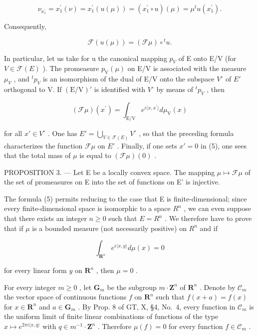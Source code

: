 \[
\nu_ {x _ {1} ^ {\prime}} = x _ {1} ^ {\prime} (\nu) = x _ {1} ^ {\prime} (u (\mu)) = \left(x _ {1} ^ {\prime} \circ u\right) (\mu) = \mu^ {t} u \left(x _ {1} ^ {\prime}\right).
\]

Consequently,

\[
\mathscr {F} (u (\mu)) = (\mathscr {F} \mu) \circ {} ^ {t} u.\tag{4}
\]

In particular, let us take for u the canonical mapping \(p_{V}\) of E onto E/V (for \(V \in \mathcal{F}(E)\) ). The promeasure \(p_{\mathrm{V}}(\mu)\) on E/V is associated with the measure \(\mu_{V}\) , and \(^{t}p_{V}\) is an isomorphism of the dual of E/V onto the subspace \(V^{\circ}\) of \(E'\) orthogonal to V. If \((\mathrm{E}/\mathrm{V})'\) is identified with \(V^{\circ}\) by means of \(^{t}p_{V}\) , then

\[
(\mathcal {F} \mu) (x ^ {\prime}) = \int_ {\mathrm{E} / \mathrm{V}} e ^ {i \langle x, x ^ {\prime} \rangle} d \mu_ {\mathrm{V}} (x)\tag{5}
\]

for all \(x' \in V^{\circ}\) . One has \(E' = \bigcup_{V \in \mathcal{F}(E)} V^{\circ}\) , so that the preceding formula characterizes the function \(\mathcal{F}\mu\) on \(E'\) . Finally, if one sets \(x' = 0\) in (5), one sees that the total mass of \(\mu\) is equal to \((\mathcal{F}\mu)(0)\) .

PROPOSITION 3. --- Let E be a locally convex space. The mapping \(\mu \mapsto \mathcal{F}\mu\) of the set of promeasures on E into the set of functions on E' is injective.

The formula (5) permits reducing to the case that E is finite-dimensional; since every finite-dimensional space is isomorphic to a space \(R^{n}\) , we can even suppose that there exists an integer \(n \geqslant 0\) such that \(E = R^{n}\) . We therefore have to prove that if \(\mu\) is a bounded measure (not necessarily positive) on \(R^{n}\) and if

\[
\int_ {\mathbf {R} ^ {n}} e ^ {i \langle x, y \rangle} d \mu (x) = 0
\]

for every linear form \(y\) on \(\mathbf{R}^n\) , then \(\mu = 0\) .

For every integer \(m \geqslant 0\) , let \(\mathbf{G}_m\) be the subgroup \(m \cdot \mathbf{Z}^n\) of \(\mathbf{R}^n\) . Denote by \(\mathcal{C}_m\) the vector space of continuous functions \(f\) on \(\mathbf{R}^n\) such that \(f(x + a) = f(x)\) for \(x \in \mathbf{R}^n\) and \(a \in \mathbf{G}_m\) . By Prop. 8 of GT, X, §4, No.~4, every function in \(\mathcal{C}_m\) is the uniform limit of finite linear combinations of functions of the type \(x \mapsto e^{2\pi i\langle x,q\rangle}\) with \(q \in m^{-1} \cdot \mathbf{Z}^n\) . Therefore \(\mu(f) = 0\) for every function \(f \in \mathcal{C}_m\) .

